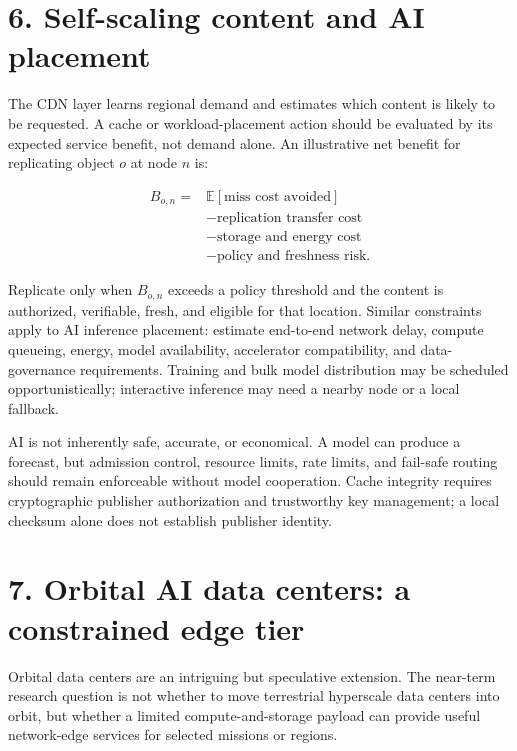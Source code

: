 \documentclass[
  american,
  11pt,
]{article}
\begin{document}
\section{6. Self-scaling content and AI
placement}\label{self-scaling-content-and-ai-placement}

The CDN layer learns regional demand and estimates which content is
likely to be requested. A cache or workload-placement action should be
evaluated by its expected service benefit, not demand alone. An
illustrative net benefit for replicating object \(o\) at node \(n\) is:

\[\begin{aligned}
B_{o,n} ={} & \mathbb{E}[\text{miss cost avoided}] \\
            & - \text{replication transfer cost} \\
            & - \text{storage and energy cost} \\
            & - \text{policy and freshness risk}.
\end{aligned}\]

Replicate only when \(B_{o,n}\) exceeds a policy threshold and the
content is authorized, verifiable, fresh, and eligible for that
location. Similar constraints apply to AI inference placement: estimate
end-to-end network delay, compute queueing, energy, model availability,
accelerator compatibility, and data-governance requirements. Training
and bulk model distribution may be scheduled opportunistically;
interactive inference may need a nearby node or a local fallback.

AI is not inherently safe, accurate, or economical. A model can produce
a forecast, but admission control, resource limits, rate limits, and
fail-safe routing should remain enforceable without model cooperation.
Cache integrity requires cryptographic publisher authorization and
trustworthy key management; a local checksum alone does not establish
publisher identity.

\section{7. Orbital AI data centers: a constrained edge
tier}\label{orbital-ai-data-centers-a-constrained-edge-tier}

Orbital data centers are an intriguing but speculative extension. The
near-term research question is not whether to move terrestrial
hyperscale data centers into orbit, but whether a limited
compute-and-storage payload can provide useful network-edge services for
selected missions or regions.
\end{document}
